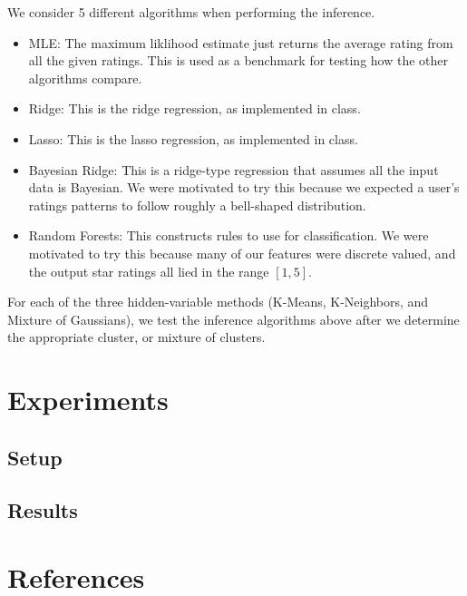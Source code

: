 \documentclass[11pt]{article}
\begin{document}
We consider 5 different algorithms when performing the inference.

\begin{itemize}
\item MLE: The maximum liklihood estimate just returns the average rating from all the given ratings. This is used as a benchmark for testing how the other algorithms compare.
\item Ridge: This is the ridge regression, as implemented in class.
\item Lasso: This is the lasso regression, as implemented in class.
\item Bayesian Ridge: This is a ridge-type regression that assumes all the input data is Bayesian. We were motivated to try this because we expected a user's ratings patterns to follow roughly a bell-shaped distribution.
\item Random Forests: This constructs rules to use for classification. We were motivated to try this because many of our features were discrete valued, and the output star ratings all lied in the range $[1, 5]$.
\end{itemize}

For each of the three hidden-variable methods (K-Means, K-Neighbors, and Mixture of Gaussians), we test the inference algorithms above after we determine the appropriate cluster, or mixture of clusters.

\section{Experiments}
\subsection{Setup}
\subsection{Results}


\section{References}
\end{document}
